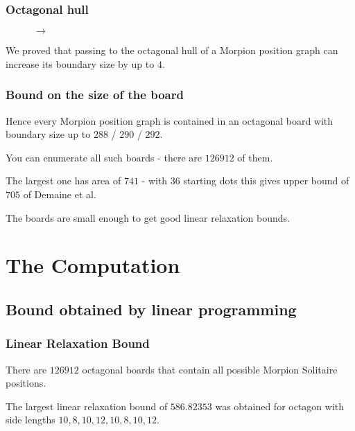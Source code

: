 \documentclass[pdftex]{beamer}
\begin{document}
\begin{frame}
\frametitle{Octagonal hull}

\begin{figure}
\begin{minipage}{.48\textwidth}
  \centering
  
\end{minipage}%
\begin{minipage}{.03\textwidth}
$\to$
\end{minipage}%
\begin{minipage}{.48\textwidth}
  \centering
  
\end{minipage}
\end{figure}

We proved that passing to the octagonal hull of a Morpion position graph can increase its boundary size by up to $4$.

\end{frame}

\begin{frame}
\frametitle{Bound on the size of the board}

Hence every Morpion position graph is contained in an octagonal board with boundary size up to $288$ / $290$ / $292$.

\vspace{5mm}
You can enumerate all such boards - there are $126912$ of them.

\vspace{5mm}
The largest one has area of $741$ - with $36$ starting dots this gives upper bound of $705$ of Demaine et al.

\vspace{5mm}
The boards are small enough to get good linear relaxation bounds.

\end{frame}

%
%

\section{The Computation}
\subsection{Bound obtained by linear programming}

\begin{frame}
\frametitle{Linear Relaxation Bound}

There are $126912$ octagonal boards that contain all possible Morpion Solitaire positions.

\pause\vspace{8mm}
The largest linear relaxation bound of $586.82353$ was obtained for octagon with side lengths $10, 8, 10, 12, 10, 8, 10, 12$.

\end{frame}
\end{document}
